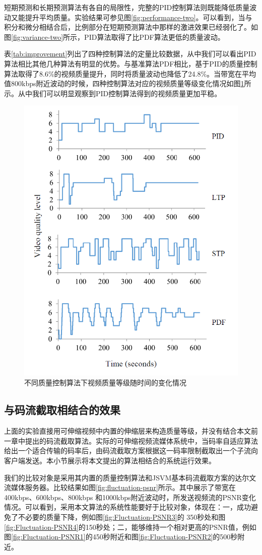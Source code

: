 短期预测和长期预测算法有各自的局限性，完整的PID控制算法则既能降低质量波动又能提升平均质量。实验结果可参见图\ref{fig:performance-two}。可以看到，当与积分和微分相结合后，比例部分在短期预测算法中那样的激进效果已经弱化了。如图\ref{fig:variance-two}所示，PID算法取得了比PDF算法更低的质量波动。

表\ref{tab:improvement}列出了四种控制算法的定量比较数据，从中我们可以看出PID算法相比其他几种算法有明显的优势。与基准算法PDF相比，基于PID的质量控制算法取得了8.6\%的视频质量提升，同时将质量波动也降低了24.8\%。当带宽在平均值800kbps附近波动的时候，四种控制算法对应的视频质量等级变化情况如图\ref{fig:fluctuation}所示。从中我们可以明显观察到PID控制算法得到的视频质量更加平稳。

\begin{figure}[t]
\centering
\includegraphics[width = 0.45\linewidth]{figures/Fluctuation.png}
\caption{不同质量控制算法下视频质量等级随时间的变化情况 \label{fig:fluctuation}}
\end{figure}

\subsection{与码流截取相结合的效果}

上面的实验直接用可伸缩视频中内置的伸缩层来构造质量等级，并没有结合本文前一章中提出的码流截取算法。实际的可伸缩视频流媒体系统中，当码率自适应算法给出一个适合传输的码率后，由码流截取方案根据这一码率限制截取出一个子流向客户端发送。本小节展示将本文提出的算法相结合的系统运行效果。

我们的比较对象是采用其内置的质量控制算法和JSVM基本码流截取方案的达尔文流媒体服务器。比较结果如图\ref{fig:fluctuation-psnr}所示。其中展示了带宽在400kbps、600kbps、800kbps
和1000kbps附近波动时，所发送视频流的PSNR变化情况。可以看到，采用本文算法的系统性能要好于比较对象，体现在：一，成功避免了不必要的质量下降，例如图\ref{fig:Fluctuation-PSNR3}的
350秒处和图\ref{fig:Fluctuation-PSNR4}的150秒处；二，能够维持一个相对更高的PSNR值，例如图\ref{fig:Fluctuation-PSNR1}的450秒附近和图\ref{fig:Fluctuation-PSNR2}的500秒附近。

